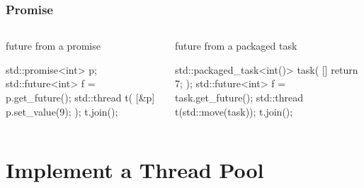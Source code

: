 \documentclass[UTF8,lualatex]{ctexbeamer}
\begin{document}
\begin{frame}[fragile]
    \frametitle{Promise}
    \scriptsize
    \begin{columns}
        \begin{column}{.5\textwidth}
            \begin{exampleblock}{future from a promise}
                \begin{cppcode}
                    std::promise<int> p;
                    std::future<int> f = p.get_future();
                    std::thread t(
                        [&p]{ p.set_value(9); });
                    t.join();
                \end{cppcode}
            \end{exampleblock}
        \end{column}
        \begin{column}{.5\textwidth}
            \begin{exampleblock}{future from a packaged task}
                \begin{cppcode}
                    std::packaged_task<int()> task(
                        []{ return 7; });
                    std::future<int> f = task.get_future();
                    std::thread t(std::move(task));
                    t.join();
                \end{cppcode}
            \end{exampleblock}
        \end{column}
    \end{columns}
\end{frame}


\section{Implement a Thread Pool}
\end{document}
